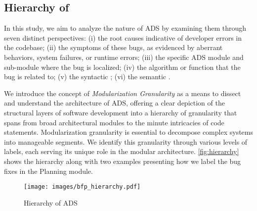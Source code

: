 \subsection{Hierarchy of }

In this study, we aim to analyze the nature of ADS \bfps by examining them through seven distinct perspectives: (i) the root causes indicative of developer errors in the codebase; (ii) the symptoms of these bugs, as evidenced by aberrant behaviors, system failures, or runtime errors; (iii) the specific ADS module and sub-module where the bug is localized; (iv) the algorithm or function that the bug is related to; (v) the syntactic \bfp; (vi) the semantic \bfp {}.

We introduce the concept of \textit{Modularization Granularity} as a means to dissect and understand the architecture of ADS, offering a clear depiction of the structural layers of software development into a hierarchy of granularity that spans from broad architectural modules to the minute intricacies of code statements.
Modularization granularity is essential to decompose complex systems into manageable segments. We identify this granularity through various levels of labels, each serving its unique role in the modular architecture.
\autoref{fig:hierarchy} shows the hierarchy along with two examples presenting how we label the bug fixes in the Planning module.

\begin{figure}[ht]
\centering
\texttt{[image: images/bfp\_hierarchy.pdf]}
\caption{Hierarchy of ADS }
\label{fig:hierarchy}
\end{figure}

